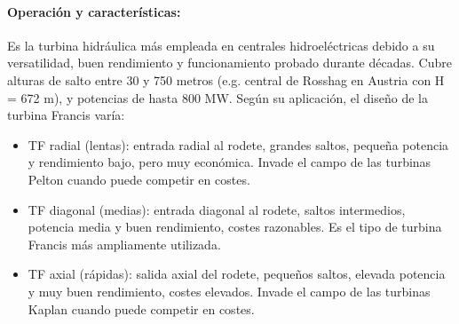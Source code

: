 \paragraph{Operación y características:}
Es la turbina hidráulica más empleada en centrales hidroeléctricas debido a su versatilidad, buen rendimiento y funcionamiento probado durante décadas. Cubre alturas de salto entre 30 y 750 metros (e.g. central de Rosshag en Austria con H = 672 m), y potencias de hasta 800 MW. Según su aplicación, el diseño de la turbina Francis varía:
\begin{itemize}
    \item TF radial (lentas): entrada radial al rodete, grandes saltos, pequeña potencia y rendimiento bajo, pero muy económica. Invade el campo de las turbinas Pelton cuando puede competir en costes.
    \item TF diagonal (medias): entrada diagonal al rodete, saltos intermedios, potencia media y buen rendimiento, costes razonables. Es el tipo de turbina Francis más ampliamente utilizada.
    \item TF axial (rápidas): salida axial del rodete, pequeños saltos, elevada potencia y muy buen rendimiento, costes elevados. Invade el campo de las turbinas Kaplan cuando puede competir en costes.
\end{itemize}

